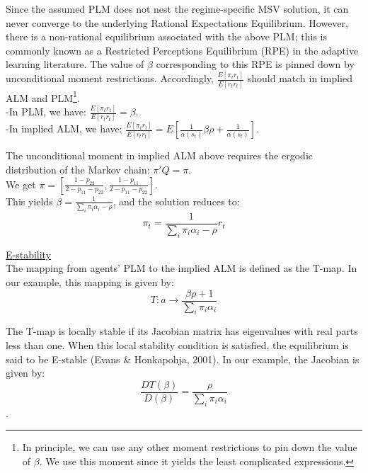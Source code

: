 \documentclass[12pt,reqno]{article}
\numberwithin{equation}{section}
\begin{document}
Since the assumed PLM does not nest the regime-specific MSV solution, it can never converge to the underlying Rational Expectations Equilibrium. However, there is a non-rational equilibrium associated with the above PLM; this is commonly known as a Restricted Perceptions Equilibrium (RPE) in the adaptive learning literature. The value of $\beta$ corresponding to this RPE is pinned down by unconditional moment restrictions. Accordingly, $\frac{E [\pi_t r_t]}{E[r_t r_t]} $ should match in implied ALM and PLM\footnote{In principle, we can use any other moment restrictions to pin down the value of $\beta$. We use this moment since it yields the least complicated expressions.}. \\

-In PLM, we have: $\frac{E [\pi_t r_t]}{E[r_t r_t]} =\beta $.\\

-In implied ALM, we have: $\frac{ E[\pi_t r_t]}{E[r_t r_t]} = E[ \frac{1}{\alpha(s_t)} \beta \rho + \frac{1}{\alpha(s_t)}]$.

The unconditional moment in implied ALM above requires the ergodic distribution of the Markov chain: $ \pi' Q = \pi $. \\

We get $ \pi = [ \frac{1-p_{22}}{2-p_{11}- p_{22}}, \frac{1-p_{11}}{2-p_{11}-p_{22}}] $. \\

This yields $ \beta = \frac{1}{\sum_i \pi_i \alpha_i  -\rho } $, and the solution reduces to: \\

$$ \pi_t = \frac{1}{\sum_i \pi_i \alpha_i  -\rho} r_t $$

\underline{E-stability} \\

The mapping from agents' PLM to the implied ALM is defined as the T-map. In our example, this mapping is given by: \\

$$ T: a \rightarrow \frac{\beta \rho + 1 }{\sum_i \pi_i \alpha_i} $$

The T-map is locally stable if its Jacobian matrix has eigenvalues with real parts less than one. When this local stability condition is satisfied, the equilibrium is said to be E-stable (Evans \& Honkapohja, 2001). In our example, the Jacobian is given by: \\

$$ \frac{DT(\beta)}{D(\beta)} = \frac{\rho}{\sum_i \pi_i \alpha_i} $$. 
\end{document}
